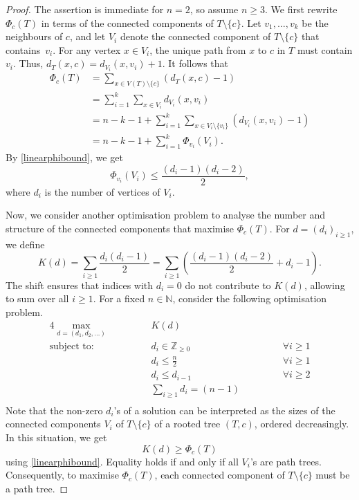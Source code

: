\documentclass[reqno,dvipsnames]{amsart}
\theoremstyle{plain}
\numberwithin{equation}{section}
\theoremstyle{definition}
\begin{document}
\begin{proof}
	The assertion is immediate for $n=2$, so assume $n\geq 3$. We first rewrite $\Phi_c(T)$ in terms of the connected components of $T\setminus \{c\}$. Let $v_1,\ldots, v_k$ be the neighbours of $c$, and let $V_i$ denote the connected component of $T\setminus\{c\}$ that contains~$v_i$. For any vertex $x\in V_i$, the unique path from $x$ to $c$ in $T$ must contain $v_i$. Thus, $d_T(x,c) = d_{V_i}(x,v_i) + 1$. It follows that
	\begin{align*}
		\Phi_c(T) &= \sum_{x\in V(T)\setminus\{c\}} (d_T(x,c) - 1) \\
			&= \sum_{i=1}^k \sum_{x\in V_i} d_{V_i}(x,v_i) \\
			&= n-k-1 + \sum_{i=1}^k \sum_{x\in V_i\setminus \{v_i\}} (d_{V_i}(x,v_i) - 1) \\
			&= n-k-1 + \sum_{i=1}^k \Phi_{v_i} (V_i).
	\end{align*}
	By \autoref{linearphibound}, we get
	\[
		\Phi_{v_i} (V_i) \leq \frac{(d_i-1) (d_i-2)}{2},
	\]
	where $d_i$ is the number of vertices of $V_i$. 
	
	Now, we consider another optimisation problem to analyse the number and structure of the connected components that maximise $\Phi_c(T)$. For $d = (d_i)_{i\geq 1}$, we define
	\[
		K(d) = \sum_{i\geq 1} \frac{d_i (d_i-1)}{2} = \sum_{i\geq 1} \left(\frac{(d_i-1) (d_i-2)}{2} + d_i-1 \right).
	\]
	The shift ensures that indices with $d_i=0$ do not contribute to $K(d)$, allowing to sum over all $i\geq 1$. For a fixed $n\in \mathbb{N}$, consider the following optimisation problem.
	\begin{alignat*}{4}
		\max_{d = (d_1,d_2,\dots)}	&\qquad	&& K(d) &\qquad&&\\
		\text{subject to:} 				&\qquad	&&d_i\in \mathbb{Z}_{\geq 0} &\qquad&&\forall i\geq 1\\
		&\qquad	&&d_i\leq \frac{n}{2} &\qquad&&\forall i\geq 1\\
		&\qquad	&& d_i\leq d_{i-1} &\qquad&&\forall i\geq 2\\
		&\qquad	&&\sum_{i\geq 1}d_i = (n-1) &\qquad&&\\
	\end{alignat*}
	Note that the non-zero $d_i$'s of a solution can be interpreted as the sizes of the connected components $V_i$ of $T\setminus\{c\}$ of a rooted tree $(T,c)$, ordered decreasingly. In this situation, we get
	\[	
		K(d) \geq \Phi_c(T) 
	\]
	using \autoref{linearphibound}. Equality holds if and only if all $V_i$'s are path trees. Consequently, to maximise $\Phi_c(T)$, each connected component of $T\setminus\{c\}$ must be a path tree.


\end{proof}
\end{document}
